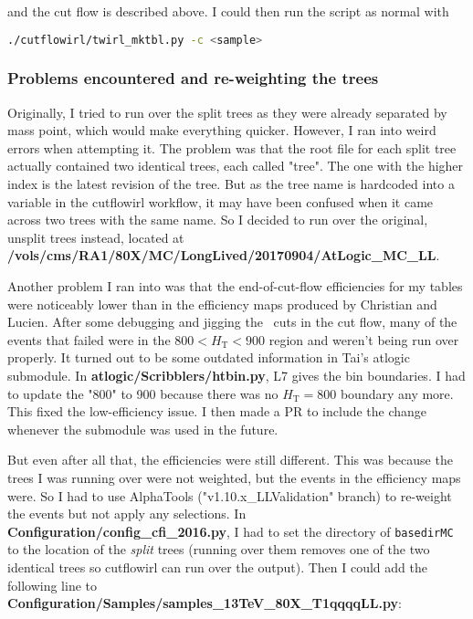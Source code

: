and the cut flow is described above. I could then run the script as normal with

\begin{lstlisting}[belowskip=-0.7cm, language=sh, numbers=none]
./cutflowirl/twirl_mktbl.py -c <sample>
\end{lstlisting}


\subsubsection{Problems encountered and re-weighting the trees}

Originally, I tried to run over the split trees as they were already separated by mass point, which would make everything quicker. However, I ran into weird errors when attempting it. The problem was that the root file for each split tree actually contained two identical trees, each called "tree". The one with the higher index is the latest revision of the tree. But as the tree name is hardcoded into a variable in the cutflowirl workflow, it may have been confused when it came across two trees with the same name. So I decided to run over the original, unsplit trees instead, located at \textbf{/vols/cms/RA1/80X/MC/LongLived/20170904/AtLogic\_MC\_LL}.

Another problem I ran into was that the end-of-cut-flow efficiencies for my tables were noticeably lower than in the efficiency maps produced by Christian and Lucien. After some debugging and jigging the \alphat\ cuts in the cut flow, many of the events that failed were in the $800 < H_{\mathrm{T}} < 900$ region and weren't being run over properly. It turned out to be some outdated information in Tai's atlogic submodule. In \textbf{atlogic/Scribblers/htbin.py}, L7 gives the bin boundaries. I had to update the "800" to 900 because there was no $H_{\mathrm{T}} = 800$ boundary any more. This fixed the low-efficiency issue. I then made a PR to include the change whenever the submodule was used in the future.

But even after all that, the efficiencies were still different. This was because the trees I was running over were not weighted, but the events in the efficiency maps were. So I had to use AlphaTools ("v1.10.x\_LLValidation" branch) to re-weight the events but not apply any selections. In \textbf{Configuration/config\_cfi\_2016.py}, I had to set the directory of \texttt{basedirMC} to the location of the \emph{split} trees (running over them removes one of the two identical trees so cutflowirl can run over the output). Then I could add the following line to \textbf{Configuration/Samples/samples\_13TeV\_80X\_T1qqqqLL.py}:

